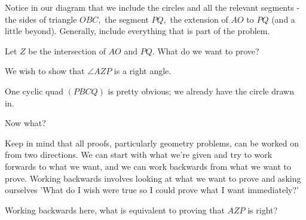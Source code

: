 Notice in our diagram that we include the circles and all the relevant segments - the sides of triangle $OBC,$ the segment $PQ,$ the extension of $AO$ to $PQ $ (and a little beyond). Generally, include everything that is part of the problem.

Let $Z$ be the intersection of $AO$ and $PQ.$  What do we want to prove?










We wish to show that $\angle AZP$ is a right angle.

One cyclic quad $(PBCQ)$ is pretty obvious; we already have the circle drawn in.

Now what?

Keep in mind that all proofs, particularly geometry problems, can be worked on from two directions. We can start with what we're given and try to work forwards to what we want, and we can work backwards from what we want to prove. Working backwards involves looking at what we want to prove and asking ourselves 'What do I wish were true so I could prove what I want immediately?'

Working backwards here, what is equivalent to proving that $AZP$ is right?


